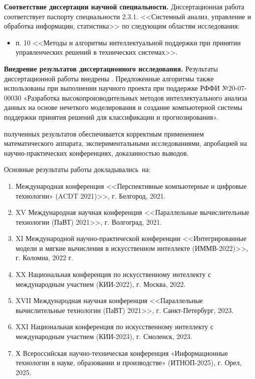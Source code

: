 \textbf{Соответствие диссертации научной специальности.} Диссертационная работа соответствует паспорту специальности 2.3.1. <<Системный анализ, управление и обработка информации, статистика>> по следующим областям исследования:
\begin{itemize}
  \item п. 10 <<Методы и алгоритмы интеллектуальной поддержки при принятии управленческих решений в технических системах>>.
\end{itemize}

\textbf{Внедрение результатов диссертационного исследования.} Результаты диссертационной работы внедрены \todo{\dots}. Предложенные алгоритмы также использованы при выполнении научного проек­та при поддержке РФФИ №20-07-00030 «Разработка высокопроизводительных методов интеллектуального анализа данных на основе нечеткого моделиро­вания и создание компьютерной системы поддержки принятия решений для классификации и прогнозирования».

{\reliability} полученных результатов обеспечивается корректным применением математического аппарата, экспериментальными исследованиями, апробацией на научно-практических конференциях, доказанностью выводов.

{\probation}
Основные результаты работы докладывались~на:
\begin{enumerate}
	\item Международная конференция <<Перспективные компьютерные и цифровые технологии» (ACDT 2021)>>,
	г. Белгород, 2021.
	\item XV Международная научная конференция <<Параллельные вычислительные технологии (ПаВТ) 2021>>, г. Волгоград, 2021.
	\item XI Международной научно-практической конференции <<Интегрированные модели и мягкие вычисления в искусственном интеллекте (ИММВ-2022)>>, г. Коломна, 2022 г.
	\item XX Национальная конференция по искусственному интеллекту с международным участием (КИИ-2022), г. Москва, 2022.
	\item XVII Международная научная конференция <<Параллельные вычислительные технологии (ПаВТ) 2021>>, г. Санкт-Петербург, 2023.
	\item XXI Национальная конференция по искусственному интеллекту с международным участием (КИИ-2023), г. Смоленск, 2023.
	\item Х Всероссийская научно-техническая конференция «Информационные технологии в науке, образовании и производстве» (ИТНОП-2025), г. Орел, 2025.
\end{enumerate}

